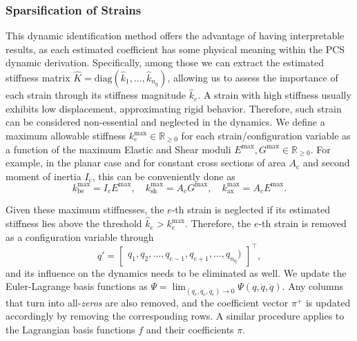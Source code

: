 \subsubsection{Sparsification of Strains}\label{ssub:pcsregression:strain_spars}
This dynamic identification method offers the advantage of having interpretable results, as each estimated coefficient has some physical meaning within the \gls{PCS} dynamic derivation. Specifically, among those we can extract the estimated stiffness matrix $\hat{K} = \mathrm{diag}(\hat{k}_1, \dots, \hat{k}_{n_\mathrm{q}})$, allowing us to assess the importance of each strain through its stiffness magnitude $\hat{k}_e$. A strain with high stiffness usually exhibits low displacement, approximating rigid behavior. Therefore, such strain can be considered non-essential and neglected in the dynamics.
We define a maximum allowable stiffness $k^\mathrm{max}_e \in \mathbb{R}_{\geq0}$ for each strain/configuration variable as a function of the maximum Elastic and Shear moduli $E^{\text{max}}, G^{\text{max}} \in \mathbb{R}_{\geq 0}$. For example, in the planar case and for constant cross sections of area $A_\mathrm{c}$ and second moment of inertia $I_\mathrm{c}$, this can be conveniently done as
\begin{equation}
    k_{\mathrm{be}}^{\mathrm{max}} = I_c E^{\mathrm{max}},
    \quad
    k_{\text{sh}}^{\text{max}} = A_c G^{\mathrm{max}},
    \quad
    k_{\text{ax}}^{\text{max}} = A_c E^{\text{max}}.
\end{equation}

Given these maximum stiffnesses, the $e$-th strain is neglected if its estimated stiffness lies above the threshold $\hat{k}_e>k_e^{\mathrm{max}}$. Therefore, the $e$-th strain is removed as a configuration variable through
\begin{equation}
    q' = \begin{bmatrix}
        q_1, q_2, \ldots, q_{e-1}, q_{e+1}, \ldots, q_{n_\mathrm{q}})
    \end{bmatrix}^\top,
\end{equation}
and its influence on the dynamics needs to be eliminated as well. We update the Euler-Lagrange basis functions as $\Psi = \lim_{(q_e,\dot{q}_e,\ddot{q}_e)\to 0} \Psi (q, \dot{q}, \ddot{q})$. Any columns that turn into all-\emph{zeros} are also removed, and the coefficient vector $\pi^+$ is updated accordingly by removing the corresponding rows. A similar procedure applies to the Lagrangian basis functions $f$ and their coefficients $\pi$.

